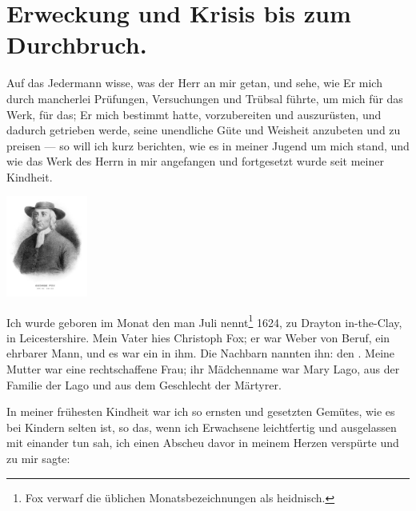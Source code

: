 \chapter[Erweckung und Krisis]{Erweckung und Krisis bis zum Durchbruch.}




Auf das Jedermann wisse, was der Herr an mir getan, und
sehe, wie Er mich durch mancherlei Prüfungen, Versuchungen und
Trübsal führte, um mich für das Werk, für das; Er mich bestimmt 
hatte, vorzubereiten und auszurüsten, und dadurch getrieben 
werde, seine unendliche Güte und Weisheit anzubeten und
zu preisen — so will ich kurz berichten, wie es in meiner Jugend
um mich stand, und wie das Werk des Herrn in mir angefangen
und fortgesetzt wurde seit meiner Kindheit.

\begin{floatingfigure}[3]{4cm}
\includegraphics[width=0.20\textwidth]{./pics/Fox-George-LOC.png}
\label{bild:gfox} 
\end{floatingfigure}




Ich wurde geboren im Monat den man Juli nennt\footnote{Fox 
verwarf die üblichen Monatsbezeichnungen als heidnisch.} 
1624, zu Drayton in-the-Clay, 
in Leicestershire. Mein Vater hies
Christoph Fox; er war Weber von Beruf, 
ein ehrbarer Mann,
und es war ein  in ihm. Die Nachbarn
nannten ihn: den . Meine Mutter war eine
rechtschaffene Frau; ihr Mädchenname war Mary Lago, aus der
Familie der Lago und aus dem Geschlecht der Märtyrer.

In meiner frühesten Kindheit war ich so ernsten und gesetzten
Gemütes, wie es bei Kindern selten ist, so das, wenn ich Erwachsene 
leichtfertig und ausgelassen mit einander tun sah, ich
einen Abscheu davor in meinem Herzen verspürte und zu mir
sagte: 

